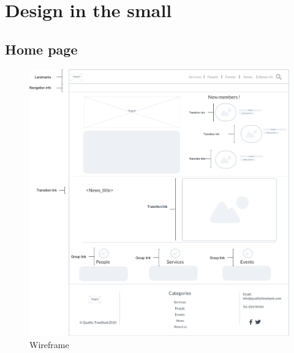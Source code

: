 \documentclass[a4paper, 11pt, parskip=half, headsepline]{scrreprt}
\begin{document}
\chapter{Design in the small}

\section{Home page}

\begin{figure}[H]
    \centering
    \includegraphics[width=0.93\linewidth, keepaspectratio]{wireframes/Homepage}
    \caption{Wireframe}
\end{figure}
\end{document}
